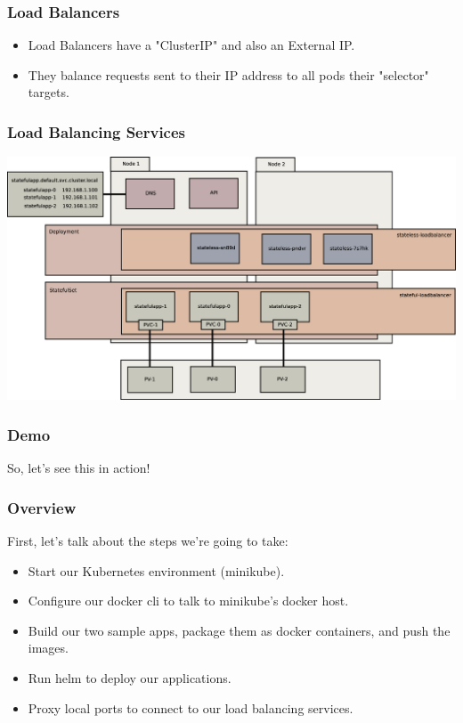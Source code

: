 \documentclass{beamer}
\begin{document}
\begin{frame}
    \frametitle{Load Balancers}
    \begin{itemize}
        \item Load Balancers have a "ClusterIP" and also an External IP.
        \item They balance requests sent to their IP address to all pods their "selector" targets.
    \end{itemize}
\end{frame}

\begin{frame}
    \frametitle{Load Balancing Services}
    \includegraphics[width=\textwidth,height=0.85\textheight,keepaspectratio]{graphics/08-loadBalancer.eps}
\end{frame}

\begin{frame}
    \frametitle{Demo}
    \begin{center}
        \Huge So, let's see this in action!
    \end{center}
\end{frame}

\begin{frame}
    \frametitle{Overview}
    First, let's talk about the steps we're going to take:
    \begin{itemize}
        \item Start our Kubernetes environment (minikube).
        \item Configure our docker cli to talk to minikube's docker host.
        \item Build our two sample apps, package them as docker containers, and push the images.
        \item Run helm to deploy our applications.
        \item Proxy local ports to connect to our load balancing services.
    \end{itemize}
\end{frame}
\end{document}
